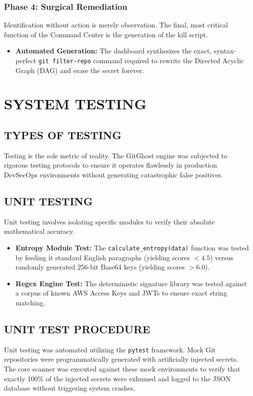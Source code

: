 \documentclass[12pt, a4paper, oneside]{report}
\begin{document}
\subsection{Phase 4: Surgical Remediation}
Identification without action is merely observation. The final, most critical function of the Command Center is the generation of the kill script.
\begin{itemize}
    \item \textbf{Automated Generation:} The dashboard synthesizes the exact, syntax-perfect \texttt{git filter-repo} command required to rewrite the Directed Acyclic Graph (DAG) and erase the secret forever.
\end{itemize}

\chapter{SYSTEM TESTING}

\section{TYPES OF TESTING}
Testing is the sole metric of reality. The GitGhost engine was subjected to rigorous testing protocols to ensure it operates flawlessly in production DevSecOps environments without generating catastrophic false positives.

\section{UNIT TESTING}
Unit testing involves isolating specific modules to verify their absolute mathematical accuracy.
\begin{itemize}
    \item \textbf{Entropy Module Test:} The \texttt{calculate\_entropy(data)} function was tested by feeding it standard English paragraphs (yielding scores $< 4.5$) versus randomly generated 256-bit Base64 keys (yielding scores $> 6.0$).
    \item \textbf{Regex Engine Test:} The deterministic signature library was tested against a corpus of known AWS Access Keys and JWTs to ensure exact string matching.
\end{itemize}

\section{UNIT TEST PROCEDURE}
Unit testing was automated utilizing the \texttt{pytest} framework. Mock Git repositories were programmatically generated with artificially injected secrets. The core scanner was executed against these mock environments to verify that exactly 100\% of the injected secrets were exhumed and logged to the JSON database without triggering system crashes.
\end{document}
